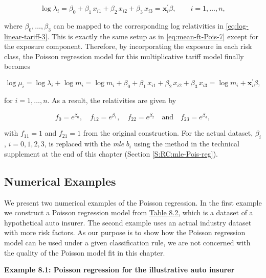 \documentclass[]{book}
\theoremstyle{definition}
\theoremstyle{definition}
\theoremstyle{definition}
\theoremstyle{remark}
\begin{document}
\begin{equation}
\log \lambda_{i}= \beta_0+ \beta_1 \, x_{i1} + \beta_{2} \, x_{i2} +\beta_3  \, x_{i3}=\mathbf{ x}^{\prime}_i\beta, \qquad i=1, \ldots, n,
\end{equation}

where \(\beta_0, \ldots, \beta_3\) can be mapped to the corresponding
log relativities in \eqref{eq:log-linear-tariff-3}. This is exactly the
same setup as in \eqref{eq:mean-ft-Pois-7} except for the exposure
component. Therefore, by incorporating the exposure in each risk class,
the Poisson regression model for this multiplicative tariff model
finally becomes

\begin{equation}
\log \mu_i=\log \lambda_{i}+\log m_i= \log m_i+ \beta_0+ \beta_1 \, x_{i1} + \beta_{2} \, x_{i2} +\beta_3  \, x_{i3}=\log m_i+\mathbf{ x}^{\prime}_i\beta, 
\end{equation}

for \(i=1, \ldots, n\). As a result, the relativities are given by

\begin{equation}
{f}_0=e^{\beta_0}, \quad {f}_{12}=e^{\beta_1}, \quad {f}_{22}=e^{\beta_2} \quad \text{and}\quad {f}_{23}=e^{\beta_3},
\label{eq:relativity-1}
\end{equation}

with \(f_{11}=1\) and \(f_{21}=1\) from the original construction. For
the actual dataset, \(\beta_i\), \(i=0,1, 2, 3\), is replaced with the
\emph{mle} \(b_i\) using the method in the technical supplement at the
end of this chapter (Section \ref{S:RC:mle-Pois-reg}).

\subsection{Numerical Examples}\label{numerical-examples}

We present two numerical examples of the Poisson regression. In the
first example we construct a Poisson regression model from
\protect\hyperlink{tab:8.2}{Table 8.2}, which is a dataset of a
hypothetical auto insurer. The second example uses an actual industry
dataset with more risk factors. As our purpose is to show how the
Poisson regression model can be used under a given classification rule,
we are not concerned with the quality of the Poisson model fit in this
chapter.

\textbf{Example 8.1: Poisson regression for the illustrative auto
insurer}
\end{document}
